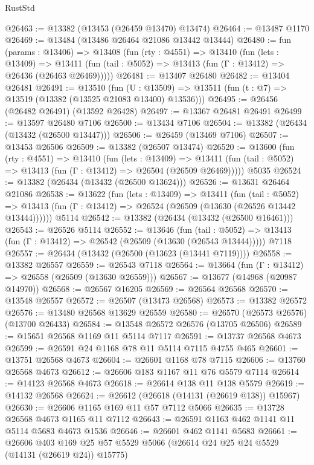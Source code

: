 \begin{lexlean}{RustStd}
\begin{coremodule}
@26463 := @13382 (@13453 (@26459 @13470) @13474)
@26464 := @13487 @1170
@26469 := @13484 (@13486 @26464 @21086 @13442 @13444)
@26480 := fun (params : @13406) =>
  @13408
    (fun (rty : @4551) =>
    @13410
      (fun (lets : @13409) =>
      @13411 (fun (tail : @5052) => @13413 (fun (Γ : @13412) => @26436 (@26463 @26469)))))
@26481 := @13407 @26480
@26482 := @13404 @26481
@26491 := @13510
    (fun (U : @13509) => @13511 (fun (t : @7) => @13519 (@13382 (@13525 @21083 @13400) @13536)))
@26495 := @26456 (@26482 @26491) (@13592 @26428)
@26497 := @13367 @26481 @26491
@26499 := @13597 @26480 @7106
@26500 := @13434 @7106
@26504 := @13382 (@26434 (@13432 (@26500 @13447)))
@26506 := @26459 (@13469 @7106)
@26507 := @13453 @26506
@26509 := @13382 (@26507 @13474)
@26520 := @13600
    (fun (rty : @4551) =>
    @13410
      (fun (lets : @13409) =>
      @13411 (fun (tail : @5052) => @13413 (fun (Γ : @13412) => @26504 (@26509 @26469)))))
    @5035
@26524 := @13382 (@26434 (@13432 (@26500 @13624)))
@26526 := @13631 @26464 @21086
@26538 := @13622
    (fun (lets : @13409) =>
    @13411
      (fun (tail : @5052) =>
      @13413 (fun (Γ : @13412) => @26524 (@26509 (@13630 (@26526 @13442 @13444))))))
    @5114
@26542 := @13382 (@26434 (@13432 (@26500 @16461)))
@26543 := @26526 @5114
@26552 := @13646
    (fun (tail : @5052) => @13413 (fun (Γ : @13412) => @26542 (@26509 (@13630 (@26543 @13444)))))
    @7118
@26557 := @26434 (@13432 (@26500 (@13623 (@13441 @7119))))
@26558 := @13382 @26557
@26559 := @26543 @7118
@26564 := @13664 (fun (Γ : @13412) => @26558 (@26509 (@13630 @26559)))
@26567 := @13677 (@14968 (@20987 @14970))
@26568 := @26567 @16205
@26569 := @26564 @26568
@26570 := @13548 @26557
@26572 := @26507 (@13473 @26568)
@26573 := @13382 @26572
@26576 := @13480 @26568 @13629 @26559
@26580 := @26570 (@26573 @26576) (@13700 @26433)
@26584 := @13548 @26572 @26576 (@13705 @26506)
@26589 := @15651 @26568 @1169 @11 @5114 @7117
@26591 := @13737 @26568 @4673
@26599 := @26591 @24 @1168 @78 @11 @5114 @7115 @4755 @465
@26601 := @13751 @26568 @4673
@26604 := @26601 @1168 @78 @7115
@26606 := @13760 @26568 @4673
@26612 := @26606 @183 @1167 @11 @76 @5579 @7114
@26614 := @14123 @26568 @4673
@26618 := @26614 @138 @11 @138 @5579
@26619 := @14132 @26568
@26624 := @26612 (@26618 (@14131 (@26619 @138)) @15967)
@26630 := @26606 @1165 @169 @11 @57 @7112 @5066
@26635 := @13728 @26568 @4673 @1165 @11 @7112
@26643 := @26591 @1163 @462 @1141 @11 @5114 @5683 @4673 @1536
@26646 := @26601 @462 @1141 @5683
@26661 := @26606
    @403
    @169
    @25
    @57
    @5529
    @5066
    (@26614 @24 @25 @24 @5529 (@14131 (@26619 @24)) @15775)

\end{coremodule}
\end{lexlean}
